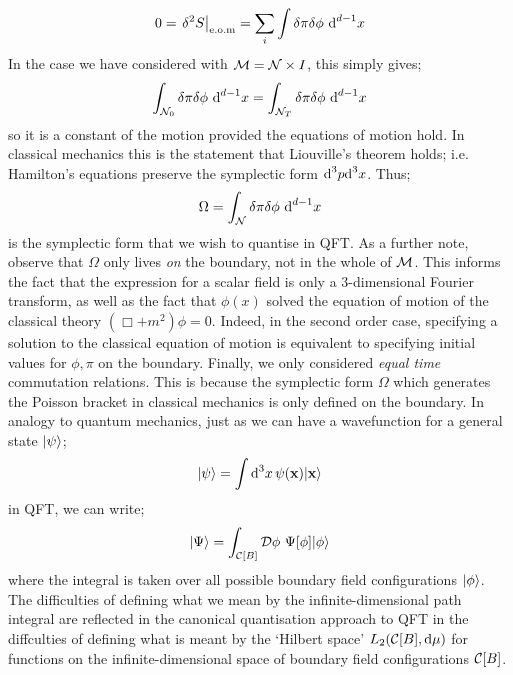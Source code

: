 \begin{equation*}
0 = \left.\delta^2 S\right|_{\text{e.o.m}} = \sum_{i}{\int{\delta \pi \delta \phi \,\,\ud^{d-1}x}}
\end{equation*}
In the case we have considered with $\mathcal{M} = \mathcal{N} \times I$, this simply gives;
\begin{equation}
\int_{\mathcal{N}_0}{\delta \pi \delta \phi \,\,\text{d}^{d-1}x} = \int_{\mathcal{N}_T}{\delta \pi \delta \phi \,\,\text{d}^{d-1}x}
\end{equation}
so it is a constant of the motion provided the equations of motion hold. In classical mechanics this is the statement that Liouville's theorem holds; i.e. Hamilton's equations preserve the symplectic form $\text{d}^3 p \text{d}^3 x$. Thus;
\begin{equation}
\Omega = \int_{\mathcal{N}}{\delta \pi \delta \phi \,\, \text{d}^{d-1} x}
\end{equation}
is the symplectic form that we wish to quantise in QFT. As a further note, observe that $\Omega$ only lives \emph{on} the boundary, not in the whole of $\mathcal{M}$. This informs the fact that the expression for a scalar field is only a $3$-dimensional Fourier transform, as well as the fact that $\phi(x)$ solved the equation of motion of the classical theory $(\Box + m^2)\phi = 0$. Indeed, in the second order case, specifying a solution to the classical equation of motion is equivalent to specifying initial values for $\phi, \pi$ on the boundary. Finally, we only considered \emph{equal time} commutation relations. This is because the symplectic form $\Omega$ which generates the Poisson bracket in classical mechanics is only defined on the boundary. In analogy to quantum mechanics, just as we can have a wavefunction for a general state $\ket{\psi}$;
\begin{equation*}
\ket{\psi} = \int{\upd{^3 x} \psi(\vec x) \ket{\vec x}}
\end{equation*}
in QFT, we can write;\footnotemark
\begin{equation}
\ket{\Psi} = \int_{\mC[B]}{\mD \phi \,\, \Psi[\phi] \ket{\phi}}
\end{equation}
where the integral is taken over all possible boundary field configurations $\ket{\phi}$. The difficulties of defining what we mean by the infinite-dimensional path integral are reflected in the canonical quantisation approach to QFT in the diffculties of defining what is meant by the `Hilbert space' $L_2(\mathcal{C}[B], \text{d} \mu)$ for functions on the infinite-dimensional space of boundary field configurations $\mathcal{C}[B]$.
\newpage
